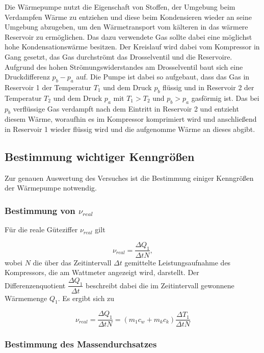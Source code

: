 Die Wärmepumpe nutzt die Eigenschaft von Stoffen, der Umgebung beim Verdampfen Wärme zu entziehen und diese beim Kondensieren wieder an seine Umgebung abzugeben, um den Wärmetransport vom kälteren in das wärmere Reservoir
zu ermöglichen. Das dazu verwendete Gas sollte dabei eine möglichst hohe Kondensationswärme besitzen. Der Kreislauf wird dabei vom Kompressor in Gang gesetzt, das Gas durchströmt das Drosselventil und die Reservoire.
Aufgrund des hohen Strömungswiderstandes am Drosselventil baut sich eine Druckdifferenz $p_b-p_a$ auf.
Die Pumpe ist dabei so aufgebaut, dass das Gas in Reservoir 1 der Temperatur $T_1$ und dem Druck $p_b$ flüssig und in Reservoir 2 der Temperatur $T_2$ und dem Druck $p_a$ mit $T_1 > T_2$ und $p_b > p_a$ gasförmig ist.
Das bei $p_b$ verflüssige Gas verdampft nach dem Eintritt in Reservoir 2 und entzieht diesem Wärme, woraufhin es im Kompressor komprimiert wird und anschließend in Reservoir 1 wieder flüssig wird und die aufgenomme Wärme
an dieses abgibt.

\subsection{Bestimmung wichtiger Kenngrößen}

Zur genauen Auswertung des Versuches ist die Bestimmung einiger Kenngrößen der Wärmepumpe notwendig.

\subsubsection{Bestimmung von $ν_{real}$}

Für die reale Güteziffer $ν_{real}$ gilt

\begin{equation}
    ν_{real} = \dfrac{ΔQ_1}{ΔtN},
\end{equation}
wobei $N$ die über das Zeitintervall $Δt$ gemittelte Leistungsaufnahme des Kompressors, die am Wattmeter angezeigt wird, darstellt. 
Der Differenzenquotient $\dfrac{ΔQ_1}{Δt}$ beschreibt dabei die im Zeitintervall gewonnene Wärmemenge $Q_1$. Es ergibt sich zu

\begin{equation}
    ν_{real} = \dfrac{ΔQ_1}{ΔtN} = (m_1c_w + m_kc_k)\dfrac{ΔT_1}{ΔtN}
    \label{eq:effrealdiffquo}
\end{equation}

\subsubsection{Bestimmung des Massendurchsatzes}

